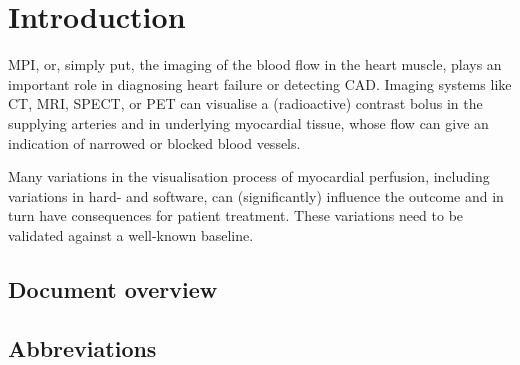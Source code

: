 \chapter{Introduction}
\label{ch:Intro}

\Ac{MPI}, or, simply put, the imaging of the blood flow in the heart muscle, plays an important role in diagnosing heart failure or detecting \ac{CAD}. Imaging systems like \ac{CT}, \ac{MRI}, \ac{SPECT}, or \ac{PET} can visualise a (radioactive) contrast bolus in the supplying arteries and in underlying myocardial tissue, whose flow can give an indication of narrowed or blocked blood vessels.

Many variations in the visualisation process of myocardial perfusion, including variations in hard- and software, can (significantly) influence the outcome and in turn have consequences for patient treatment. These variations need to be validated against a well-known baseline.

\section*{Document overview}
\label{sec:doc_overview}

\section*{Abbreviations}
\begin{multicols}{2}
	\printacronyms[include-classes=abbrev, name=Abbreviations, heading=none]
\end{multicols}